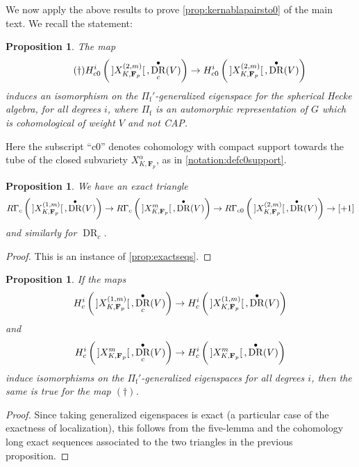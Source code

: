 \documentclass[cjm]{ipart}
\theoremstyle{plain}
\newtheorem{proposition}[theorem]{Proposition}
\theoremstyle{remark}
\DeclareMathOperator{\DR}{DR}
\DeclarePairedDelimiter{\tb}{{\,]}}{{[\, }} %
\newcommand{\Fp}{\mathbf{F}_p}
\newcommand{\Pif}{\Pi_{\mathrm{f}}}
\numberwithin{equation}{subsection}
\begin{document}
  We now apply the above results to prove \cref{prop:kernablapairsto0} of the main text. We recall the statement: 
  
  \begin{proposition}
   \label{prop:forgetsupports-appendix}
   The map
   \[ \tag{\dag} H^i_{c0}\left(\tb{X_{K, \Fp}^{(2, m)}}, \DR^\bullet_c(V)\right) \to  H^i_{c0}\left(\tb{X_{K, \Fp}^{(2, m)}}, \DR^\bullet(V)\right) \]
   induces an isomorphism on the $\Pif'$-generalized eigenspace for the spherical Hecke algebra, for all degrees $i$, where $\Pif$ is an automorphic representation of $G$ which is cohomological of weight $V$ and not CAP.
  \end{proposition}
  
  Here the subscript ``c0'' denotes cohomology with compact support towards the tube of the closed subvariety $X_{K, \Fp}^{\alpha}$, as in \cref{notation:defc0support}.
  
  \begin{proposition}
   We have an exact triangle
   \[ 
    R\Gamma_{c}\left(\tb{X_{K, \Fp}^{(1, m)}}, \DR^\bullet(V)\right) \to R\Gamma_{c}\left(\tb{X_{K, \Fp}^{m}}, \DR^\bullet(V)\right) \to R\Gamma_{c0}\left(\tb{X_{K, \Fp}^{(2, m)}},  \DR^\bullet(V)\right) \to [+1] 
   \]
   and similarly for $\DR_c$.
  \end{proposition}
  
  \begin{proof} 
   This is an instance of \cref{prop:exactseqs}. 
  \end{proof}
  
  \begin{proposition}
   \label{prop:interior-reduction}
   If the maps 
   \[ H^i_{c}\left(\tb{X_{K, \Fp}^{(1, m)}}, \DR^\bullet_c(V)\right) \to  H^i_{c}\left(\tb{X_{K, \Fp}^{(1, m)}}, \DR^\bullet(V)\right)\]
   and
   \[ H^i_{c}\left(\tb{X_{K, \Fp}^{m}}, \DR^\bullet_c(V)\right) \to  H^i_{c}\left(\tb{X_{K, \Fp}^{m}}, \DR^\bullet(V)\right)\]
   induce isomorphisms on the $\Pif'$-generalized eigenspaces for all degrees $i$, then the same is true for the map $(\dag)$.
  \end{proposition}
  
  \begin{proof}
   Since taking generalized eigenspaces is exact (a particular case of the exactness of localization), this follows from the five-lemma and the cohomology long exact sequences associated to the two triangles in the previous proposition.
  \end{proof}
  
\end{document}
